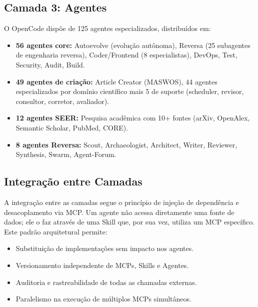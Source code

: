 \documentclass[
  brazil,
  sumario=tradicional,
  10pt
]{abntex2}
\begin{document}
\subsection{Camada 3: Agentes}

O OpenCode dispõe de 125 agentes especializados, distribuídos em:

\begin{itemize}
  \item \textbf{56 agentes core:} Autoevolve (evolução autônoma),
    Reversa (25 subagentes de engenharia reversa), Coder/Frontend
    (8 especialistas), DevOps, Test, Security, Audit, Build.
  \item \textbf{49 agentes de criação:} Article Creator (MASWOS),
    44 agentes especializados por domínio científico mais 5 de
    suporte (scheduler, revisor, consultor, corretor, avaliador).
  \item \textbf{12 agentes SEER:} Pesquisa acadêmica com 10+
    fontes (arXiv, OpenAlex, Semantic Scholar, PubMed, CORE).
  \item \textbf{8 agentes Reversa:} Scout, Archaeologist, Architect,
    Writer, Reviewer, Synthesis, Swarm, Agent-Forum.
\end{itemize}

\subsection{Integração entre Camadas}

A integração entre as camadas segue o princípio de injeção de
dependência e desacoplamento via MCP. Um agente não acessa diretamente
uma fonte de dados; ele o faz através de uma Skill que, por sua vez,
utiliza um MCP específico. Este padrão arquitetural permite:

\begin{itemize}
  \item Substituição de implementações sem impacto nos agentes.
  \item Versionamento independente de MCPs, Skills e Agentes.
  \item Auditoria e rastreabilidade de todas as chamadas externas.
  \item Paralelismo na execução de múltiplos MCPs simultâneos.
\end{itemize}
\end{document}
